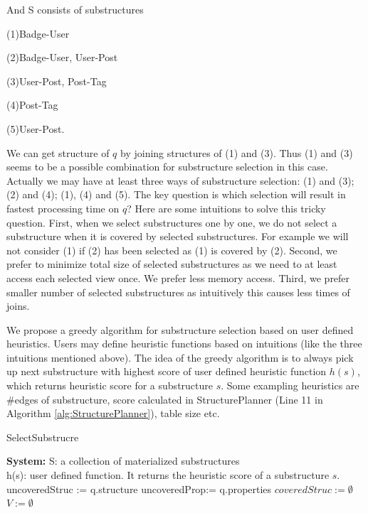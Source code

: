 And S consists of substructures 

(1)Badge-User

(2)Badge-User, User-Post 

(3)User-Post, Post-Tag

(4)Post-Tag

(5)User-Post.

We can get structure of $q$ by joining structures of (1) and (3). Thus (1) and (3) seems to be a possible combination for substructure selection in this case. Actually we may have at least three ways of substructure selection: (1) and (3); (2) and (4);
(1), (4) and (5). The key question is which selection will result in fastest processing time on $q$? Here are some intuitions to solve this tricky question. First, when we select substructures one by one, we do not select a substructure when it is covered by selected substructures. For example we will not consider (1) if (2) has been selected as (1) is covered by (2). Second, we prefer to minimize total size of selected substructures as we need to at least access each selected view once. We prefer less memory access. Third, we prefer smaller number of selected substructures as intuitively this causes less times of joins. 

We propose a greedy algorithm for substructure selection based on user defined heuristics. Users may define heuristic functions based on intuitions (like the three intuitions mentioned above). The idea of the greedy algorithm is to always pick up next substructure with highest score of user defined heuristic function $h(s)$, which returns heuristic score for a substructure $s$. Some exampling heuristics are \#edges of substructure, score calculated in StructurePlanner (Line 11 in Algorithm \ref{alg:StructurePlanner}), table size etc. 

\begin{algorithm}[H]
\caption{SelectSubstrucre}
\label{alg:SelectSubstrucre}
\LinesNumbered
\textbf{System:} S: a collection of materialized substructures\\ h(s): user defined function. It returns the heuristic score of a substructure $s$.\\
uncoveredStruc := q.structure\;
uncoveredProp:= q.properties\; 
$coveredStruc:= \emptyset$\;
$V:=\emptyset $\;
\end{algorithm}

